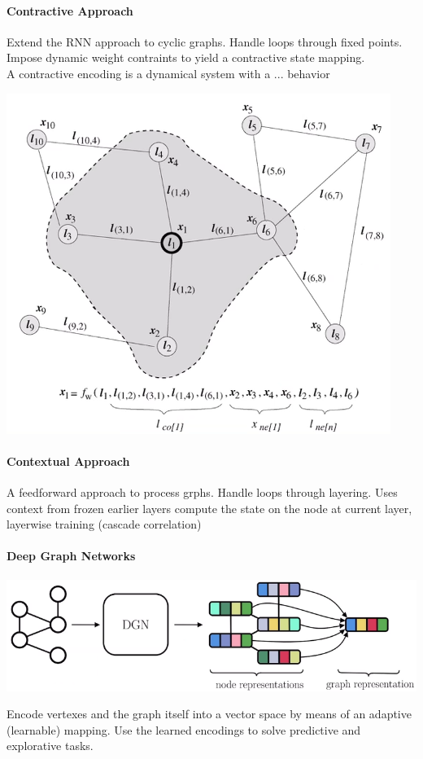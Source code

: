 \documentclass[10pt]{report}
\begin{document}
\paragraph{Contractive Approach} Extend the RNN approach to cyclic graphs. Handle loops through fixed points. Impose dynamic weight contraints to yield a contractive state mapping.\\
A contractive encoding is a dynamical system with a ... behavior %
\begin{center}
	\includegraphics[scale=0.5]{194.png}
\end{center}
\paragraph{Contextual Approach} A feedforward approach to process grphs. Handle loops through layering. Uses context from frozen earlier layers compute the state on the node at current layer, layerwise training (cascade correlation) %
\paragraph{Deep Graph Networks}
\begin{center}
	\includegraphics[scale=0.5]{195.png}
\end{center}
Encode vertexes and the graph itself into a vector space by means of an adaptive (learnable) mapping. Use the learned encodings to solve predictive and explorative tasks.
\end{document}
